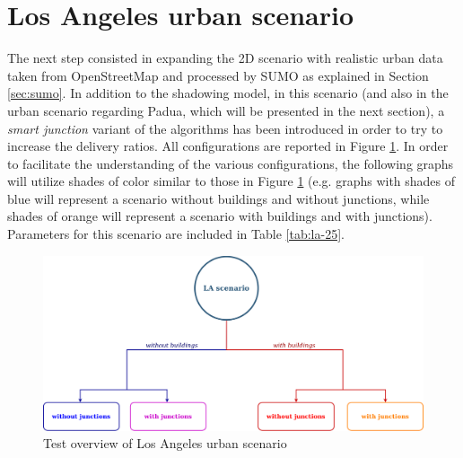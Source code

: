 
	\section{Los Angeles urban scenario}
		The next step consisted in expanding the 2D scenario with realistic urban data taken from OpenStreetMap and processed by SUMO as explained in Section \ref{sec:sumo}. In addition to the shadowing model, in this scenario (and also in the urban scenario regarding Padua, which will be presented in the next section), a \textit{smart junction} variant of the algorithms has been introduced in order to try to increase the delivery ratios. All configurations are reported in Figure \ref{fig:la-overview}. In order to facilitate the understanding of the various configurations, the following graphs will utilize shades of color similar to those in Figure \ref{fig:la-overview} (e.g. graphs with shades of blue will represent a scenario without buildings and without junctions, while shades of orange will represent a scenario with buildings and with junctions). Parameters for this scenario are included in Table \ref{tab:la-25}.  
		
		\begin{figure}[H]
			\centering
			\includegraphics[width=1.0\textwidth]{immagini/la-25/overview}
			\caption{Test overview of Los Angeles urban scenario}
			\label{fig:la-overview}
		\end{figure}
	
